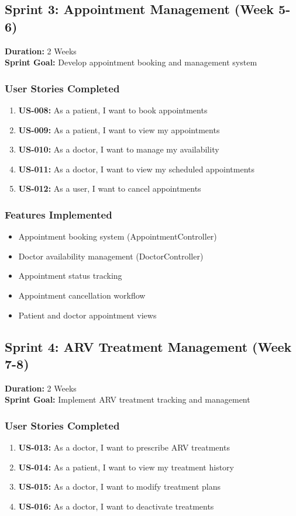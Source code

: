 \documentclass[12pt,a4paper]{article}
\begin{document}
\subsection{Sprint 3: Appointment Management (Week 5-6)}
\textbf{Duration:} 2 Weeks \\
\textbf{Sprint Goal:} Develop appointment booking and management system

\subsubsection{User Stories Completed}
\begin{enumerate}
    \item \textbf{US-008:} As a patient, I want to book appointments
    \item \textbf{US-009:} As a patient, I want to view my appointments
    \item \textbf{US-010:} As a doctor, I want to manage my availability
    \item \textbf{US-011:} As a doctor, I want to view my scheduled appointments
    \item \textbf{US-012:} As a user, I want to cancel appointments
\end{enumerate}

\subsubsection{Features Implemented}
\begin{itemize}
    \item Appointment booking system (AppointmentController)
    \item Doctor availability management (DoctorController)
    \item Appointment status tracking
    \item Appointment cancellation workflow
    \item Patient and doctor appointment views
\end{itemize}

\subsection{Sprint 4: ARV Treatment Management (Week 7-8)}
\textbf{Duration:} 2 Weeks \\
\textbf{Sprint Goal:} Implement ARV treatment tracking and management

\subsubsection{User Stories Completed}
\begin{enumerate}
    \item \textbf{US-013:} As a doctor, I want to prescribe ARV treatments
    \item \textbf{US-014:} As a patient, I want to view my treatment history
    \item \textbf{US-015:} As a doctor, I want to modify treatment plans
    \item \textbf{US-016:} As a doctor, I want to deactivate treatments
\end{enumerate}
\end{document}
